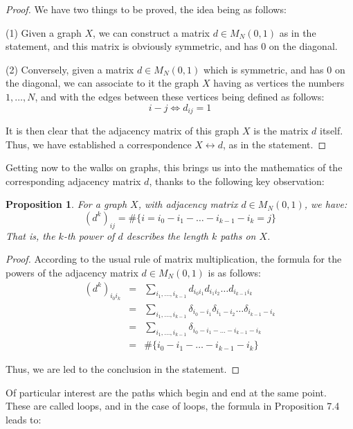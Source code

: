 \documentclass[12pt]{amsbook}
\newtheorem{proposition}[theorem]{Proposition}
\begin{document}
\begin{proof}
We have two things to be proved, the idea being as follows:

\medskip

(1) Given a graph $X$, we can construct a matrix $d\in M_N(0,1)$ as in the statement, and this matrix is obviously symmetric, and has $0$ on the diagonal.

\medskip

(2) Conversely, given a matrix $d\in M_N(0,1)$ which is symmetric, and has $0$ on the diagonal, we can associate to it the graph $X$ having as vertices the numbers $1,\ldots,N$, and with the edges between these vertices being defined as follows:
$$i-j\iff d_{ij}=1$$

It is then clear that the adjacency matrix of this graph $X$ is the matrix $d$ itself. Thus, we have established a correspondence $X\leftrightarrow d$, as in the statement.
\end{proof}

Getting now to the walks on graphs, this brings us into the mathematics of the corresponding adjacency matrix $d$, thanks to the following key observation:


\begin{proposition}
For a graph $X$, with adjacency matrix $d\in M_N(0,1)$, we have:
$$(d^k)_{ij}=\#\Big\{i=i_0-i_1-\ldots-i_{k-1}-i_k=j\Big\}$$
That is, the $k$-th power of $d$ describes the length $k$ paths on $X$.
\end{proposition}

\begin{proof}
According to the usual rule of matrix multiplication, the formula for the powers of the adjacency matrix $d\in M_N(0,1)$ is as follows:
\begin{eqnarray*}
(d^k)_{i_0i_k}
&=&\sum_{i_1,\ldots,i_{k-1}}d_{i_0i_1}d_{i_1i_2}\ldots d_{i_{k-1}i_k}\\
&=&\sum_{i_1,\ldots,i_{k-1}}\delta_{i_0-i_1}\delta_{i_1-i_2}\ldots\delta_{i_{k-1}-i_k}\\
&=&\sum_{i_1,\ldots,i_{k-1}}\delta_{i_0-i_1-\ldots-i_{k-1}-i_k}\\
&=&\#\Big\{i_0-i_1-\ldots-i_{k-1}-i_k\Big\}
\end{eqnarray*}

Thus, we are led to the conclusion in the statement.
\end{proof}

Of particular interest are the paths which begin and end at the same point. These are called loops, and in the case of loops, the formula in Proposition 7.4 leads to:
\end{document}
